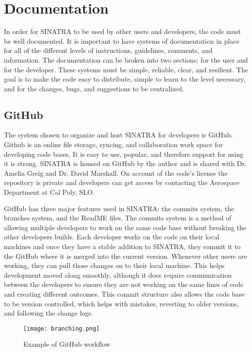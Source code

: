\section{Documentation}
In order for SINATRA to be used by other users and developers, the code must be well documented. It is important to have systems of documentation in place for all of the different levels of instructions, guidelines, comments, and information. The documentation  can be broken into two sections; for the user and for the developer. These systems must be simple, reliable, clear, and resilient. The goal is to make the code easy to distribute, simple to learn to the level necessary, and for the changes, bugs, and suggestions to be centralized.

\subsection{GitHub}
The system chosen to organize and host SINATRA for developers is GitHub. Github is an online file storage, syncing, and collaboration work space for developing code bases. It is easy to use, popular, and therefore support for using it is strong. SINATRA is housed on GitHub by the author and is shared with Dr. Amelia Greig and Dr. David Marshall. On account of the code’s license the repository is private and developers can get access by contacting the Aerospace Department at Cal Poly, SLO. \par
\indent GitHub has three major features used in SINATRA: the commits system, the branches system, and the ReadME files. The commits system is a method of allowing multiple developers to work on the same code base without breaking the other developers builds. Each developer works on the code on their local machines and once they have a stable addition to SINATRA, they commit it to the GitHub where it is merged into the current version. Whenever other users are working, they can pull those changes on to their local machine. This helps development moved along smoothly, although it does require communication between the developers to ensure they are not working on the same lines of code and creating different outcomes. This commit structure also allows the code base to be version controlled, which helps with mistakes, reverting to older versions, and following the change logs. \par


\begin{figure}
\texttt{[image: branching.png]}
\centering
\caption{Example of GitHub workflow}
\label{fig:github}
\end{figure}




